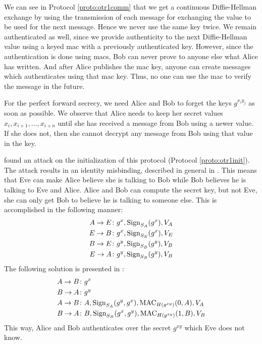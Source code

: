 We can see in Protocol \ref{proto:otr1comm} that we get a continuous 
Diffie-Hellman exchange by using the transmission of each message for 
exchanging the value to be used for the next message.
Hence we never use the same key twice.
We remain authenticated as well, since we provide authenticity to the next 
Diffie-Hellman value using a keyed \ac{mac} with a previously authenticated 
key.
However, since the authentication is done using \acp{mac}, Bob can never prove 
to anyone else what Alice has written.
And after Alice publishes the \ac{mac} key, anyone can create messages which 
authenticates using that \ac{mac} key.
Thus, no one can use the \ac{mac} to verify the message in the future.

For the perfect forward secrecy, we need Alice and Bob to forget the keys 
\(g^{x_i y_j}\) as soon as possible.
We observe that Alice needs to keep her secret values \(x_i, x_{i+1}, \ldots, 
x_{i+n}\) until she has received a message from Bob using a newer value.
If she does not, then she cannot decrypt any message from Bob using that value 
in the key.

\citeauthor{di2005secure} \cite{di2005secure} found an attack on the 
initialization of this protocol (Protocol \ref{proto:otr1init}).
The attack results in an identity misbinding, described in general in 
\cite{ake}.
This means that Eve can make Alice believe she is talking to Bob while Bob 
believes he is talking to Eve and Alice.
Alice and Bob can compute the secret key, but not Eve, she can only get Bob to 
believe he is talking to someone else.
This is accomplished in the following manner:
\begin{align*}
  A\to E &\colon g^x, \operatorname{\mathrm{Sign}}_{S_A}( g^x ), V_A \\
  E\to B &\colon g^x, \operatorname{\mathrm{Sign}}_{S_E}( g^x ), V_E \\
  B\to E &\colon g^y, \operatorname{\mathrm{Sign}}_{S_B}( g^y ), V_B \\
  E\to A &\colon g^y, \operatorname{\mathrm{Sign}}_{S_B}( g^y ), V_B \\
\end{align*}
The following solution is presented in \cite{di2005secure}:
\begin{align*}
  A\to B &\colon g^{x} \\
  B\to A &\colon g^{y} \\
  A\to B &\colon A,
    \operatorname{\mathrm{Sign}}_{S_A}( g^{y}, g^{x} ),
    \operatorname{\mathrm{MAC}}_{H( g^{x y} )}( 0, A ),
    V_A \\
  B\to A &\colon B,
    \operatorname{\mathrm{Sign}}_{S_B}( g^{x}, g^{y} ),
    \operatorname{\mathrm{MAC}}_{H( g^{x y} )}( 1, B ),
    V_B \\
\end{align*}
This way, Alice and Bob authenticates over the secret \(g^{xy}\) which Eve does 
not know.

